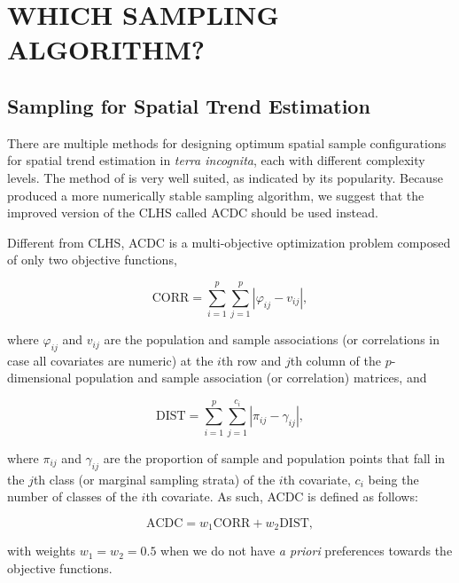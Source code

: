 \section{WHICH SAMPLING ALGORITHM?}

\subsection{Sampling for Spatial Trend Estimation}

There are multiple methods for designing optimum spatial sample configurations for spatial trend estimation in 
\emph{terra incognita}, each with different complexity levels. The method of \citet{MinasnyEtAl2006b} is very 
well suited, as indicated by its popularity. Because \citet{Samuel-RosaEtAl2016} produced a more numerically 
stable sampling algorithm, we suggest that the improved version of the CLHS called ACDC should be used instead.

Different from CLHS, ACDC is a multi-objective optimization problem composed of only two objective functions,

\begin{equation}\label{eqn:chap09-corr}
 \text{CORR} = \sum_{i=1}^{p}\sum_{j=1}^{p}|\varphi_{ij} - v_{ij}|,
\end{equation}

\noindent where $\varphi_{ij}$ and $v_{ij}$ are the population and sample associations (or correlations in case 
all covariates are numeric) at the $i$th row and $j$th column of the $p$-dimensional population and sample 
association (or correlation) matrices, and

\begin{equation}\label{eqn:chap09-dist}
 \text{DIST} = \sum_{i=1}^{p}\sum_{j=1}^{c_i} |\pi_{ij} - \gamma_{ij}|,
\end{equation}

\noindent where $\pi_{ij}$ and $\gamma_{ij}$ are the proportion of sample and population points that fall in 
the $j$th class (or marginal sampling strata) of the $i$th covariate, $c_i$ being the number of classes of the 
$i$th covariate. As such, ACDC is defined as follows:

\begin{equation}\label{eqn:chap08-acdc}
 \text{ACDC} = w_1\text{CORR} + w_2 \text{DIST},
\end{equation}

\noindent with weights $w_1 = w_2 = 0.5$ when we do not have \emph{a priori} preferences towards the objective 
functions.

